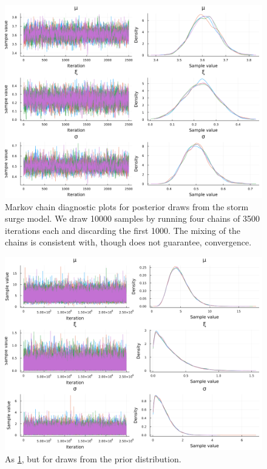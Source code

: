 \documentclass[ef,draft]{agutexSI2019}
\begin{document}
\begin{figure}
    \centering
    \includegraphics[width=\textwidth]{surge-posterior-chains}
    \caption{
        Markov chain diagnostic plots for posterior draws from the storm surge model.
        We draw \num{10000} samples by running four chains of \num{3500} iterations each and discarding the first \num{1000}.
        The mixing of the chains is consistent with, though does not guarantee, convergence.
    }\label{fig:surge-posterior-chains}
\end{figure}

\begin{figure}
    \centering
    \includegraphics[width=\textwidth]{surge-prior-chains}
    \caption{
        As \cref{fig:surge-posterior-chains}, but for draws from the prior distribution.
    }\label{fig:surge-prior-chains}
\end{figure}
\end{document}
